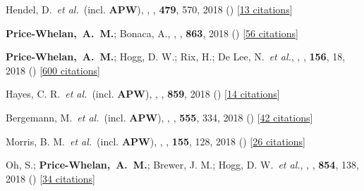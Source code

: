 \item[{\color{deemph}\scriptsize42}]Hendel, D.~\textit{et al.}~(incl. \textbf{APW}), , \mnras, \textbf{479}, 570, 2018 () [\href{http://adsabs.harvard.edu/abs/2018MNRAS.479..570H}{13 citations}]

\item[{\color{deemph}\scriptsize41}]\textbf{Price-Whelan,~A.~M.}; Bonaca, A., , \apj, \textbf{863}, 2018 () [\href{http://adsabs.harvard.edu/abs/2018ApJ...863L..20P}{56 citations}]

\item[{\color{deemph}\scriptsize40}]\textbf{Price-Whelan,~A.~M.}; Hogg, D. W.; Rix, H.; De Lee, N.~\textit{et al.}, , \aj, \textbf{156}, 18, 2018 () [\href{http://adsabs.harvard.edu/abs/2018AJ....156...18P}{600 citations}]

\item[{\color{deemph}\scriptsize39}]Hayes, C. R.~\textit{et al.}~(incl. \textbf{APW}), , \apj, \textbf{859}, 2018 () [\href{http://adsabs.harvard.edu/abs/2018ApJ...859L...8H}{14 citations}]

\item[{\color{deemph}\scriptsize38}]Bergemann, M.~\textit{et al.}~(incl. \textbf{APW}), , \nature, \textbf{555}, 334, 2018 () [\href{http://adsabs.harvard.edu/abs/2018Natur.555..334B}{42 citations}]

\item[{\color{deemph}\scriptsize37}]Morris, B. M.~\textit{et al.}~(incl. \textbf{APW}), , \aj, \textbf{155}, 128, 2018 () [\href{http://adsabs.harvard.edu/abs/2018AJ....155..128M}{26 citations}]

\item[{\color{deemph}\scriptsize36}]Oh, S.; \textbf{Price-Whelan,~A.~M.}; Brewer, J. M.; Hogg, D. W.~\textit{et al.}, , \apj, \textbf{854}, 138, 2018 () [\href{http://adsabs.harvard.edu/abs/2018ApJ...854..138O}{34 citations}]

